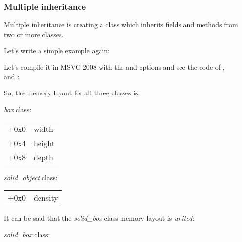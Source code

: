 \subsubsection{Multiple inheritance}


Multiple inheritance is creating a class which inherits fields and methods from two or more classes.

Let's write a simple example again:




Let's compile it in MSVC 2008 with the \Ox and \Obzero options and see the code of ,\\
 and :








So, the memory layout for all three classes is:

\emph{box} class:

\begin{center}
\begin{tabular}{ | l | l | }
\hline
  \tableheader{} \\
\hline
  +0x0 & width \\
\hline
  +0x4 & height \\
\hline
  +0x8 & depth \\
\hline
\end{tabular}
\end{center}

\emph{solid\_object} class:

\begin{center}
\begin{tabular}{ | l | l | }
\hline
  \tableheader{} \\
\hline
  +0x0 & density \\
\hline
\end{tabular}
\end{center}


It can be said that the \emph{solid\_box} class memory layout is \emph{united}:

\emph{solid\_box} class:

